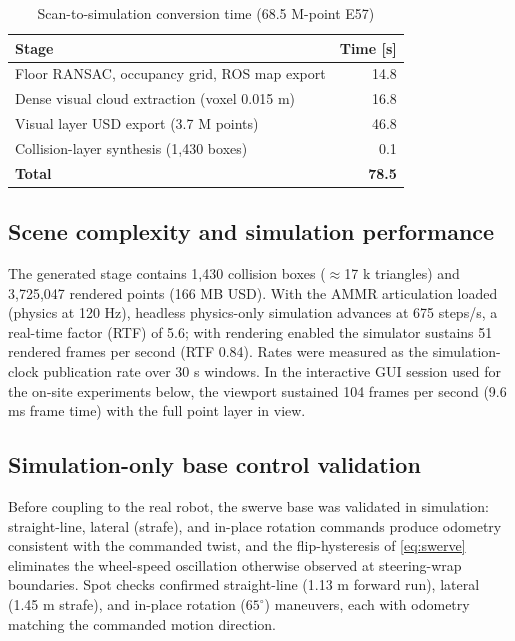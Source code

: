 \documentclass[conference]{IEEEtran}
\begin{document}
\begin{table}[htbp]
\caption{Scan-to-simulation conversion time (68.5 M-point E57)}
\begin{center}
\begin{tabular}{|l|r|}
\hline
\textbf{Stage} & \textbf{Time [s]} \\
\hline
Floor RANSAC, occupancy grid, ROS map export & 14.8 \\
Dense visual cloud extraction (voxel 0.015 m) & 16.8 \\
Visual layer USD export (3.7 M points) & 46.8 \\
Collision-layer synthesis (1{,}430 boxes) & 0.1 \\
\hline
\textbf{Total} & \textbf{78.5} \\
\hline
\end{tabular}
\label{tabtime}
\end{center}
\end{table}

\subsection{Scene complexity and simulation performance}
The generated stage contains 1{,}430 collision boxes
($\approx$17 k triangles) and 3{,}725{,}047 rendered points (166 MB
USD). With the AMMR articulation loaded (physics at 120 Hz),
headless physics-only simulation advances at 675 steps/s, a real-time
factor (RTF) of 5.6; with rendering enabled the simulator sustains
51 rendered frames per second (RTF 0.84). Rates were measured as the
simulation-clock publication rate over 30 s windows. In the interactive
GUI session used for the on-site experiments below, the viewport
sustained 104 frames per second (9.6 ms frame time) with the full point
layer in view.

\subsection{Simulation-only base control validation}
Before coupling to the real robot, the swerve base was validated in
simulation: straight-line, lateral (strafe), and in-place rotation
commands produce odometry consistent with the commanded twist, and the
flip-hysteresis of \eqref{eq:swerve} eliminates the wheel-speed
oscillation otherwise observed at steering-wrap boundaries. Spot checks
confirmed straight-line (1.13 m forward run), lateral (1.45 m strafe),
and in-place rotation ($65^{\circ}$) maneuvers, each with odometry
matching the commanded motion direction.
\end{document}
